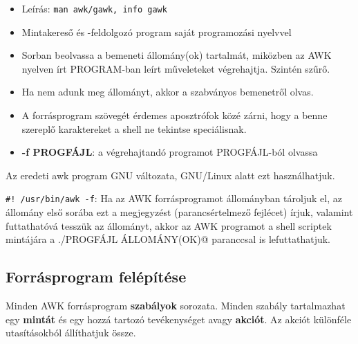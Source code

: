 \begin{center}
\end{center}

\begin{itemize}
\item Leírás: \texttt{man awk/gawk, info gawk}
\item Mintakereső és -feldolgozó program saját programozási nyelvvel
\item Sorban beolvassa a bemeneti állomány(ok) tartalmát, miközben az AWK nyelven írt PROGRAM-ban leírt műveleteket végrehajtja. Szintén szűrő.
\item Ha nem adunk meg állományt, akkor a szabványos bemenetről olvas.
\item A forrásprogram szövegét érdemes aposztrófok közé zárni, hogy a benne szereplő karaktereket a shell ne tekintse speciálisnak.
\item \textbf{-f PROGFÁJL}: a végrehajtandó programot PROGFÁJL-ból olvassa
\end{itemize}

\noindent{} Az eredeti awk program GNU változata, GNU/Linux alatt ezt használhatjuk. %
\bigskip

\noindent\verb.#! /usr/bin/awk -f.: Ha az AWK forrásprogramot állományban tároljuk el, az
állomány első sorába ezt a megjegyzést (parancsértelmező fejlécet) írjuk, valamint
futtathatóvá tesszük az állományt, akkor az AWK prog\-ra\-mot a shell scriptek
mintájára a \verb@./PROGFÁJL ÁLLOMÁNY(OK)@ paranccsal is lefuttathatjuk.

\subsection{Forrásprogram felépítése}

Minden AWK forrásprogram \textbf{szabályok} sorozata. Minden szabály
tartalmazhat egy \textbf{mintát} és egy hozzá tartozó tevékenységet avagy
\textbf{akciót}. Az akciót különféle utasításokból állíthatjuk össze.

